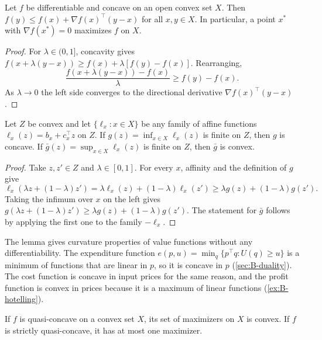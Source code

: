 \begin{lemma}\label{lem:B-concave-foc}
Let $f$ be differentiable and concave on an open convex set $X$. Then
$f(y) \leq f(x) + \nabla f(x)^\top(y - x)$ for all $x, y \in X$. In particular, a point $x^*$ with
$\nabla f(x^*) = 0$ maximizes $f$ on $X$.
\end{lemma}

\begin{proof}
For $\lambda \in (0, 1]$, concavity gives $f(x + \lambda(y - x)) \geq f(x) + \lambda[f(y) - f(x)]$. Rearranging,
\begin{equation*}
\frac{f(x + \lambda(y - x)) - f(x)}{\lambda} \geq f(y) - f(x) .
\end{equation*}
As $\lambda \to 0$ the left side converges to the directional derivative $\nabla f(x)^\top(y - x)$.
\end{proof}

\begin{lemma}\label{lem:B-minlinear}
Let $Z$ be convex and let $\{\ell_x : x \in X\}$ be any family of affine functions $\ell_x(z) = b_x + c_x^\top z$ on
$Z$. If $g(z) = \inf_{x \in X}\ell_x(z)$ is finite on $Z$, then $g$ is concave. If
$\bar g(z) = \sup_{x \in X}\ell_x(z)$ is finite on $Z$, then $\bar g$ is convex.
\end{lemma}

\begin{proof}
Take $z, z' \in Z$ and $\lambda \in [0, 1]$. For every $x$, affinity and the definition of $g$ give
\begin{equation*}
\ell_x(\lambda z + (1 - \lambda)z') = \lambda\ell_x(z) + (1 - \lambda)\ell_x(z') \geq \lambda g(z) + (1 - \lambda)g(z') .
\end{equation*}
Taking the infimum over $x$ on the left gives $g(\lambda z + (1 - \lambda)z') \geq \lambda g(z) + (1 - \lambda)g(z')$. The
statement for $\bar g$ follows by applying the first one to the family $-\ell_x$.
\end{proof}

The lemma gives curvature properties of value functions without any differentiability. The expenditure function
$e(p, u) = \min_q\{p^\top q : U(q) \geq u\}$ is a minimum of functions that are linear in $p$, so it is concave in $p$
(\cref{sec:B-duality}). The cost function is concave in input prices for the same reason, and the profit function is
convex in prices because it is a maximum of linear functions (\cref{ex:B-hotelling}).

\begin{lemma}\label{lem:B-qc-argmax}
If $f$ is quasi-concave on a convex set $X$, its set of maximizers on $X$ is convex. If $f$ is strictly
quasi-concave, it has at most one maximizer.
\end{lemma}

